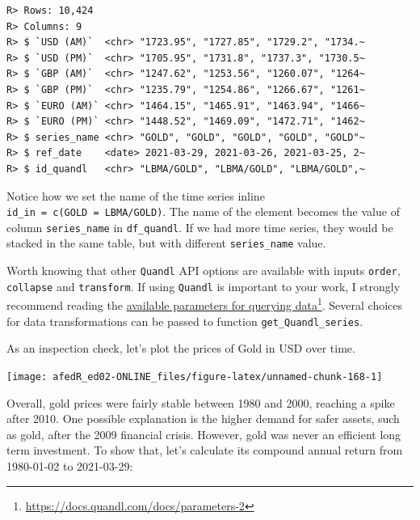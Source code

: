 \documentclass[
  12pt,
]{book}
\begin{document}
\begin{verbatim}
R> Rows: 10,424
R> Columns: 9
R> $ `USD (AM)`  <chr> "1723.95", "1727.85", "1729.2", "1734.~
R> $ `USD (PM)`  <chr> "1705.95", "1731.8", "1737.3", "1730.5~
R> $ `GBP (AM)`  <chr> "1247.62", "1253.56", "1260.07", "1264~
R> $ `GBP (PM)`  <chr> "1235.79", "1254.86", "1266.67", "1261~
R> $ `EURO (AM)` <chr> "1464.15", "1465.91", "1463.94", "1466~
R> $ `EURO (PM)` <chr> "1448.52", "1469.09", "1472.71", "1462~
R> $ series_name <chr> "GOLD", "GOLD", "GOLD", "GOLD", "GOLD"~
R> $ ref_date    <date> 2021-03-29, 2021-03-26, 2021-03-25, 2~
R> $ id_quandl   <chr> "LBMA/GOLD", "LBMA/GOLD", "LBMA/GOLD",~
\end{verbatim}

Notice how we set the name of the time series inline \texttt{id\_in\ =\ c(\textquotesingle{}GOLD\textquotesingle{}\ =\ \textquotesingle{}LBMA/GOLD\textquotesingle{})}. The name of the element becomes the value of column \texttt{series\_name} in \texttt{df\_quandl}. If we had more time series, they would be stacked in the same table, but with different \texttt{series\_name} value.

Worth knowing that other \texttt{Quandl} API options are available with inputs \texttt{order}, \texttt{collapse} and \texttt{transform}. If using \texttt{Quandl} is important to your work, I strongly recommend reading the \href{https://docs.quandl.com/docs/parameters-2}{available parameters for querying data}\footnote{\url{https://docs.quandl.com/docs/parameters-2}}. Several choices for data transformations can be passed to function \texttt{get\_Quandl\_series}.

As an inspection check, let's plot the prices of Gold in USD over time.

\begin{center}\texttt{[image: afedR\_ed02-ONLINE\_files/figure-latex/unnamed-chunk-168-1]} \end{center}

Overall, gold prices were fairly stable between 1980 and 2000, reaching a spike after 2010. One possible explanation is the higher demand for safer assets, such as gold, after the 2009 financial crisis. However, gold was never an efficient long term investment. To show that, let's calculate its compound annual return from 1980-01-02 to 2021-03-29:
\end{document}

